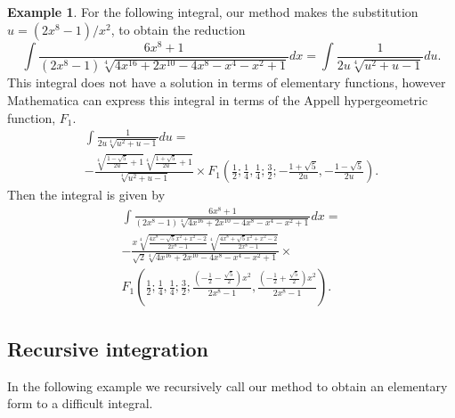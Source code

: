 \documentclass[12pt]{article}
\numberwithin{equation}{section}
\theoremstyle{definition}
\newtheorem{example}{Example}[section]
\begin{document}
\begin{example}
For the following integral, our method makes the substitution 
$u = \left(2 x^8 - 1\right)/x^2$, to obtain the reduction
\begin{equation*}
\int\frac{6 x^8+1}{\left(2 x^8-1\right) \sqrt[4]{4 x^{16}+2 x^{10}-4 x^8-x^4-x^2+1}}dx = 
\int\frac{1}{2 u \sqrt[4]{u^2+u-1}}du.
\end{equation*}
This integral does not have a solution in terms of elementary functions, however Mathematica
can express this integral in terms of the Appell hypergeometric function, 
\href{https://reference.wolfram.com/language/ref/AppellF1.html}{$F_1$}.
\begin{multline*}
\int\frac{1}{2 u \sqrt[4]{u^2+u-1}}du = \\
-\frac{\sqrt[4]{\frac{1-\sqrt{5}}{2 u}+1} \sqrt[4]{\frac{1+\sqrt{5}}{2 u}+1}}{\sqrt[4]{u^2+u-1}} \times
F_1\left(\frac{1}{2};\frac{1}{4},\frac{1}{4};\frac{3}{2};-\frac{1+\sqrt{5}}{2u},-\frac{1-\sqrt{5}}{2 u}\right).
\end{multline*}
Then the integral is given by 
\begin{multline*}
\int\frac{6 x^8+1}{\left(2 x^8-1\right) \sqrt[4]{4 x^{16}+2 x^{10}-4 x^8-x^4-x^2+1}}dx = \\
-\frac{x \sqrt[4]{\frac{4 x^8-\sqrt{5} x^2+x^2-2}{2 x^8-1}} \sqrt[4]{\frac{4 x^8+\sqrt{5}x^2+x^2-2}{2 x^8-1}}}
{\sqrt{2} \sqrt[4]{4 x^{16}+2 x^{10}-4 x^8-x^4-x^2+1}} \times \\
F_1\left(\frac{1}{2};\frac{1}{4},\frac{1}{4};\frac{3}{2};\frac{\left(-\frac{1}{2}-\frac{\sqrt{5}}{2}\right) x^2}{2 x^8-1},\frac{\left(-\frac{1}{2}+\frac{\sqrt{5}}{2}\right) x^2}{2x^8-1}\right).
\end{multline*}
\end{example}

\subsection{Recursive integration}

In the following example we recursively call our method to obtain an elementary form 
to a difficult integral. 
\end{document}
